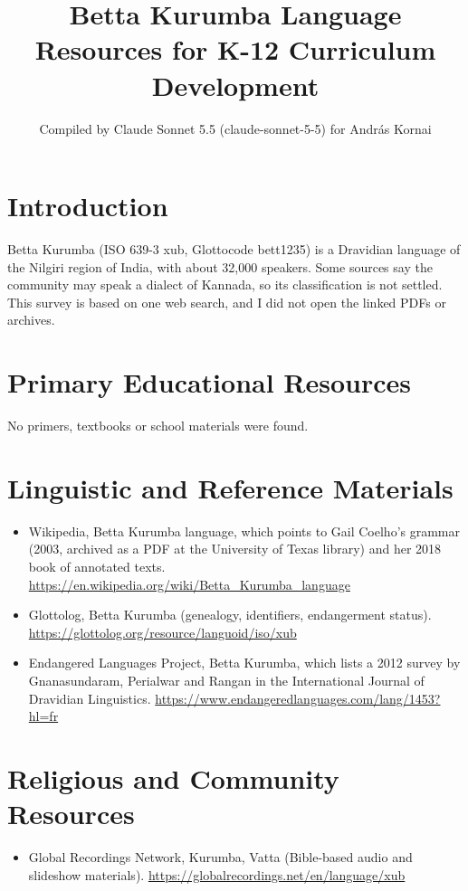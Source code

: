 \documentclass[12pt]{article}
\title{Betta Kurumba Language Resources for K-12 Curriculum Development}
\author{Compiled by Claude Sonnet 5.5 (claude-sonnet-5-5) for Andr\'as Kornai}
\date{}
\begin{document}
\maketitle

\section{Introduction}
Betta Kurumba (ISO 639-3 xub, Glottocode bett1235) is a Dravidian language of the Nilgiri region of India, with about 32,000 speakers. Some sources say the community may speak a dialect of Kannada, so its classification is not settled. This survey is based on one web search, and I did not open the linked PDFs or archives.

\section{Primary Educational Resources}
No primers, textbooks or school materials were found.

\section{Linguistic and Reference Materials}
\begin{itemize}
\item Wikipedia, Betta Kurumba language, which points to Gail Coelho's grammar (2003, archived as a PDF at the University of Texas library) and her 2018 book of annotated texts. \url{https://en.wikipedia.org/wiki/Betta_Kurumba_language}
\item Glottolog, Betta Kurumba (genealogy, identifiers, endangerment status). \url{https://glottolog.org/resource/languoid/iso/xub}
\item Endangered Languages Project, Betta Kurumba, which lists a 2012 survey by Gnanasundaram, Perialwar and Rangan in the International Journal of Dravidian Linguistics. \url{https://www.endangeredlanguages.com/lang/1453?hl=fr}
\end{itemize}

\section{Religious and Community Resources}
\begin{itemize}
\item Global Recordings Network, Kurumba, Vatta (Bible-based audio and slideshow materials). \url{https://globalrecordings.net/en/language/xub}
\end{itemize}
\end{document}
